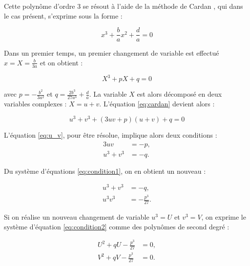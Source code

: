 Cette polynôme d'ordre 3 se résout à l'aide de la méthode de Cardan \cite{nickalls1993new}, qui dans le cas présent, s'exprime sous la forme : 

\begin{equation}
x^3+\frac{b}{a}x^2+\frac{d}{a} = 0
\end{equation}

Dans un premier temps, un premier changement de variable est effectué $x = X = \frac{b}{3a}$ et on obtient : 

\begin{equation}\label{eq:cardan}
X^3+pX+q = 0
\end{equation}

avec $p = -\frac{b^2}{3a^2}$ et $q = \frac{2b^3}{27a^3}+\frac{d}{a}$. La variable $X$ est alors décomposé en deux variables complexes : $X = u+v$. L'équation \ref{eq:cardan} devient alors : 

\begin{equation}\label{eq:u_v}
u^3+v^3+(3uv+p)(u+v)+q = 0
\end{equation}

L'équation \ref{eq:u_v}, pour être résolue, implique alors deux conditions  : 
\begin{subequations}\label{eq:condition1}
\begin{align}
3uv &= -p,\\
u^3+v^3 &= -q.
\end{align}
\end{subequations}

Du système d'équations \ref{eq:condition1}, on en obtient un nouveau : 

\begin{subequations}\label{eq:condition2}
\begin{align}
u^3+v^3 &= -q,\\
u^3v^3 &= -\frac{p^3}{27}.
\end{align}
\end{subequations}

Si on réalise un nouveau changement de variable $u^3 = U$ et $v^3 = V$, on exprime le système d'équation \ref{eq:condition2} comme des polynômes de second degré : 

\begin{subequations}\label{eq:polyUV}
\begin{align}
U^2+qU-\frac{p^3}{27} &= 0,\\
V^2+qV-\frac{p^3}{27} &= 0.
\end{align}
\end{subequations}

